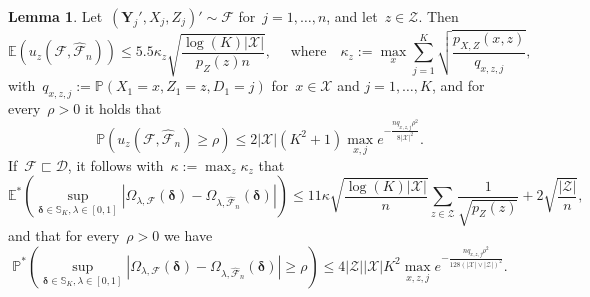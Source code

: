 \documentclass[11pt, a4paper]{article}
\theoremstyle{definition}
\newtheorem{lemma}[theorem]{Lemma}
\begin{document}
\begin{lemma}\label{lem:uzaux}
Let~$(\bm{Y}_j', X_j, Z_j)' \sim \mathcal{F}$ for~$j =1, \hdots, n$, and let~$z \in \mathcal{Z}$. Then
%
\begin{equation}\label{eqn:filemc6}
\mathbb{E}\left(u_z(\mathcal{F}, \hat{\mathcal{F}}_n)\right) \leq 5.5 \kappa_z \sqrt{\frac{\log(K)|\mathcal{X}|}{p_{Z}(z)n}}, \quad \text{ where} \quad \kappa_z := \max_{x} \sum_{j = 1}^K \sqrt{\frac{p_{X, Z}(x, z)}{q_{x, z, j}}},
\end{equation}
%
with~$q_{x,z,j} := \mathbb{P}(X_1 = x, Z_1 = z, D_1 = j)$ for~$x \in \mathcal{X}$ and $j = 1, \hdots, K$, and for every~$\rho > 0$ it holds that
%
\begin{equation}\label{eqn:filemc62}
\mathbb{P}\left(u_z(\mathcal{F}, \hat{\mathcal{F}}_n) \geq \rho\right) \leq 2 |\mathcal{X}|
\left(K^2 + 1\right)  \max_{x, j}  e^{-\frac{nq_{x,z,j} \rho^2}{8 |\mathcal{X}|^2 }}.
\end{equation}
%
If~$\mathcal{F} \sqsubset \mathscr{D}$, it follows with~$\kappa := \max_z \kappa_z$ that
%
\begin{equation}\label{eqn:filemEc6}
\mathbb{E}^*\left( \sup_{\bm{\delta} \in \mathbb{S}_K, \lambda \in [0, 1]} \left|\Omega_{\lambda, \mathcal{F}}(\bm{\delta}) - \Omega_{\lambda, \hat{\mathcal{F}}_n}(\bm{\delta}) \right| \right) \leq 11 \kappa \sqrt{ \frac{\log(K)|\mathcal{X}|}{n}} \sum_{z \in \mathcal{Z}} \frac{1}{\sqrt{p_{Z}(z)}} +  2 \sqrt{\frac{|\mathcal{Z}|}{n}},
\end{equation}
%
and that for every~$\rho > 0$ we have
%
\begin{equation}\label{eqn:filemEc62}
\mathbb{P}^*\left( \sup_{\bm{\delta} \in \mathbb{S}_K, \lambda \in [0, 1]} \left|\Omega_{\lambda, \mathcal{F}}(\bm{\delta}) - \Omega_{\lambda, \hat{\mathcal{F}}_n}(\bm{\delta})  \right| \geq \rho \right) \leq 4 | \mathcal{Z}||\mathcal{X}|K^2 \max_{x, z, j}  e^{- \frac{nq_{x,z,j} \rho^2}{128(|\mathcal{X}| \vee |\mathcal{Z}|)^2}}.
\end{equation}
%
\end{lemma}
%
\end{document}
